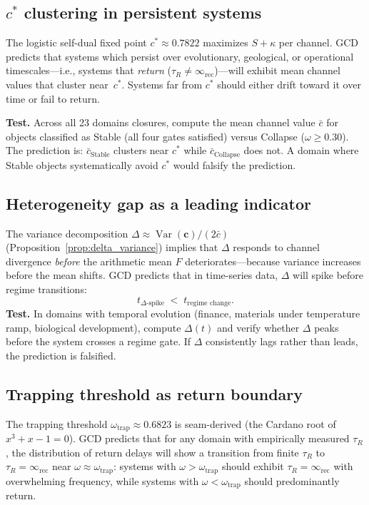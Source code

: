 \documentclass[
  aps,
  prd,
  preprint,
  superscriptaddress,
  nofootinbib,
  floatfix
]{revtex4-2}
\newcommand{\Rinf}{\infty_{\mathrm{rec}}}
\begin{document}
\subsection{$c^*$ clustering in persistent systems}
\label{pred:cstar}

The logistic self-dual fixed point $c^*\approx 0.7822$
maximizes $S+\kappa$ per channel.
GCD predicts that systems which persist over evolutionary,
geological, or operational timescales---i.e., systems
that \emph{return} ($\tau_R \neq \Rinf$)---will exhibit mean
channel values that cluster near~$c^*$.
Systems far from $c^*$ should either drift toward it over
time or fail to return.

\textbf{Test.} Across all 23 domains closures, compute the mean channel value $\bar{c}$ for objects classified
as Stable (all four gates satisfied) versus Collapse ($\omega\ge 0.30$).
The prediction is: $\bar{c}_{\text{Stable}}$ clusters near $c^*$ while $\bar{c}_{\text{Collapse}}$ does not.
A domain where Stable objects systematically avoid $c^*$ would falsify the prediction.

\subsection{Heterogeneity gap as a leading indicator}
\label{pred:delta_leading}

The variance decomposition $\Delta \approx \operatorname{Var}(\bm{c})/(2\bar{c})$
(Proposition~\ref{prop:delta_variance}) implies that $\Delta$ responds to channel divergence
\emph{before} the arithmetic mean $F$ deteriorates---because variance increases before the mean shifts.
GCD predicts that in time-series data, $\Delta$ will spike before regime transitions:
\begin{equation}
  t_{\Delta\text{-spike}} \;<\; t_{\text{regime change}}.
\end{equation}
\textbf{Test.} In domains with temporal evolution (finance, materials under temperature ramp, biological
development), compute $\Delta(t)$ and verify whether $\Delta$ peaks before the system crosses a regime gate.
If $\Delta$ consistently lags rather than leads, the prediction is falsified.

\subsection{Trapping threshold as return boundary}
\label{pred:omega_trap}

The trapping threshold $\omega_{\mathrm{trap}}\approx 0.6823$ is seam-derived (the Cardano root of $x^3+x-1=0$).
GCD predicts that for any domain with empirically measured $\tau_R$, the distribution of return delays will
show a transition from finite $\tau_R$ to $\tau_R = \Rinf$ near $\omega \approx \omega_{\mathrm{trap}}$:
systems with $\omega > \omega_{\mathrm{trap}}$ should exhibit $\tau_R = \Rinf$ with overwhelming frequency,
while systems with $\omega < \omega_{\mathrm{trap}}$ should predominantly return.
\end{document}
